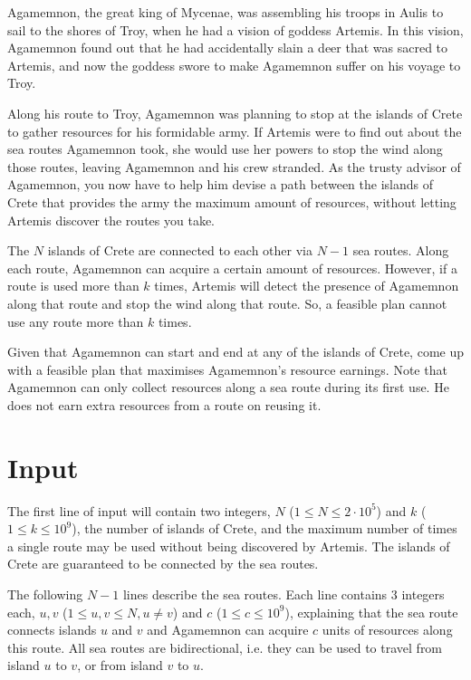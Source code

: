 
Agamemnon, the great king of Mycenae, was assembling his troops in Aulis to sail to the shores of Troy, when he had a vision of goddess Artemis. In this vision, Agamemnon found out that he had accidentally slain a deer that was sacred to Artemis, and now the goddess swore to make Agamemnon suffer on his voyage to Troy.

Along his route to Troy, Agamemnon was planning to stop at the islands of Crete to gather resources for his formidable army. If Artemis were to find out about the sea routes Agamemnon took, she would use her powers to stop the wind along those routes, leaving Agamemnon and his crew stranded. As the trusty advisor of Agamemnon, you now have to help him devise a path between the islands of Crete that provides the army the maximum amount of resources, without letting Artemis discover the routes you take.

The $N$ islands of Crete are connected to each other via $N-1$ sea routes. Along each route, Agamemnon can acquire a certain amount of resources. However, if a route is used more than $k$ times, Artemis will detect the presence of Agamemnon along that route and stop the wind along that route. So, a feasible plan cannot use any route more than $k$ times.

Given that Agamemnon can start and end at any of the islands of Crete, come up with a feasible plan that maximises Agamemnon's resource earnings. Note that Agamemnon can only collect resources along a sea route during its first use. He does not earn extra resources from a route on reusing it.

\section*{Input}

The first line of input will contain two integers, $N$ ($1 \leq N \leq 2 \cdot 10^5$) and $k$ ($1 \leq k \leq 10^9$), the number of islands of Crete, and the maximum number of times a single route may be used without being discovered by Artemis. The islands of Crete are guaranteed to be connected by the sea routes.

The following $N-1$ lines describe the sea routes. Each line contains $3$ integers each, $u, v$ ($1 \leq u, v \leq N, u \neq v$) and $c$ ($1 \leq c \leq 10^9$), explaining that the sea route connects islands $u$ and $v$ and Agamemnon can acquire $c$ units of resources along this route. All sea routes are bidirectional, i.e. they can be used to travel from island $u$ to $v$, or from island $v$ to $u$.

